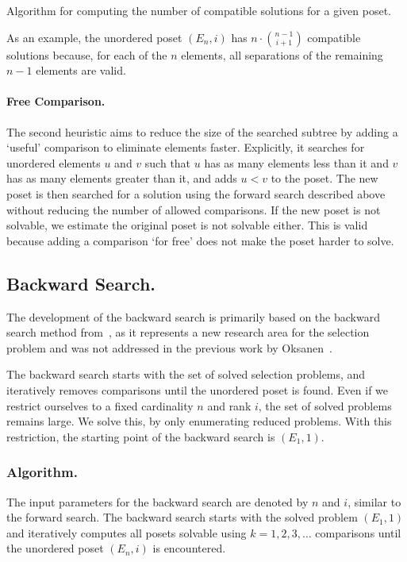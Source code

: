 \documentclass[twoside,leqno,twocolumn]{article}
\begin{document}
\begin{algorithm}[t]
  \centering
  
  \caption{Algorithm for computing the number of compatible solutions for a given poset.}
  \label{algo:compatible_solutions}
\end{algorithm}

As an example, the unordered poset $(E_n, i)$ has $n \cdot \binom{n - 1}{i + 1}$ compatible solutions because, for each of the $n$ elements, all separations of the remaining $n - 1$ elements are valid.


\paragraph{Free Comparison.}
The second heuristic aims to reduce the size of the searched subtree by adding a `useful' comparison to eliminate elements faster.
Explicitly, it searches for unordered elements $u$ and $v$ such that $u$ has as many elements less than it and $v$ has as many elements greater than it, and adds $u < v$ to the poset.
The new poset is then searched for a solution using the forward search described above without reducing the number of allowed comparisons.
If the new poset is not solvable, we estimate the original poset is not solvable either.
This is valid because adding a comparison `for free' does not make the poset harder to solve.

\subsection{Backward Search.} \label{sec:backward}
The development of the backward search is primarily based on the backward search method from~\cite{stober2022lower}, as it represents a new research area for the selection problem and was not addressed in the previous work by Oksanen~\cite{Oksanen}.

The backward search starts with the set of solved selection problems, and iteratively removes comparisons until the unordered poset is found.
Even if we restrict ourselves to a fixed cardinality $n$ and rank $i$, the set of solved problems remains large.
We solve this, by only enumerating reduced problems.
With this restriction, the starting point of the backward search is $(E_1, 1)$.

\subsubsection{Algorithm.} \label{sec:backward:algorithm}
The input parameters for the backward search are denoted by $n$ and $i$, similar to the forward search.
The backward search starts with the solved problem $(E_1, 1)$ and iteratively computes all posets solvable using $k = 1, 2, 3, \dots$ comparisons until the unordered poset $(E_n, i)$ is encountered.
\end{document}
